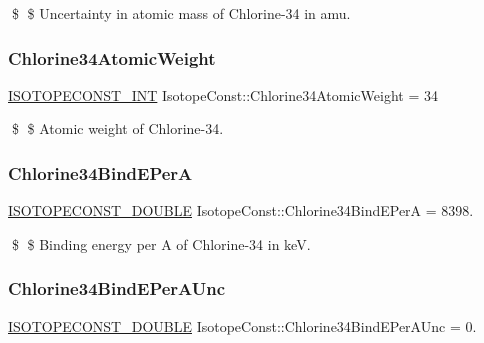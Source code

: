 \$ \$ Uncertainty in atomic mass of Chlorine-\/34 in amu. \mbox{\label{group___isotope_const-_chlorine-_cl34_ga7d485b1a2435a9576441f154d22664c0}} 
\subsubsection{\texorpdfstring{Chlorine34\+Atomic\+Weight}{Chlorine34AtomicWeight}}
{\footnotesize\ttfamily \mbox{\hyperlink{group___isotope_const-_macros_ga5f18360b3e99483a35c32d789e62621c}{I\+S\+O\+T\+O\+P\+E\+C\+O\+N\+S\+T\+\_\+\+I\+NT}} Isotope\+Const\+::\+Chlorine34\+Atomic\+Weight = 34}

\$ \$ Atomic weight of Chlorine-\/34. \mbox{\label{group___isotope_const-_chlorine-_cl34_ga3bbbf578fa17075b00efce10a1c5858c}} 
\subsubsection{\texorpdfstring{Chlorine34\+Bind\+E\+PerA}{Chlorine34BindEPerA}}
{\footnotesize\ttfamily \mbox{\hyperlink{group___isotope_const-_macros_ga8f45a7272ce02c0b4c65c44636ed719a}{I\+S\+O\+T\+O\+P\+E\+C\+O\+N\+S\+T\+\_\+\+D\+O\+U\+B\+LE}} Isotope\+Const\+::\+Chlorine34\+Bind\+E\+PerA = 8398.}

\$ \$ Binding energy per A of Chlorine-\/34 in keV. \mbox{\label{group___isotope_const-_chlorine-_cl34_gaab4f58d6119378c8ac0606edd9995101}} 
\subsubsection{\texorpdfstring{Chlorine34\+Bind\+E\+Per\+A\+Unc}{Chlorine34BindEPerAUnc}}
{\footnotesize\ttfamily \mbox{\hyperlink{group___isotope_const-_macros_ga8f45a7272ce02c0b4c65c44636ed719a}{I\+S\+O\+T\+O\+P\+E\+C\+O\+N\+S\+T\+\_\+\+D\+O\+U\+B\+LE}} Isotope\+Const\+::\+Chlorine34\+Bind\+E\+Per\+A\+Unc = 0.}

